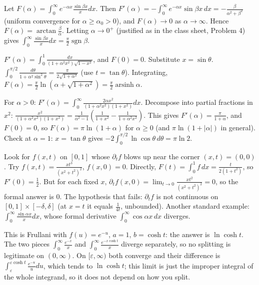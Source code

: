 \documentclass[11pt,a4paper]{article}
\begin{document}

Let \(F(\alpha)=\int_0^\infty e^{-\alpha x}\frac{\sin\beta x}xdx\). Then \(F'(\alpha)=-\int_0^\infty e^{-\alpha x}\sin\beta x\,dx=-\frac{\beta}{\alpha^2+\beta^2}\) (uniform convergence for \(\alpha\ge\alpha_0\gt0\)), and \(F(\alpha)\to0\) as \(\alpha\to\infty\).
Hence \(F(\alpha)=\arctan\frac\beta\alpha\). Letting \(\alpha\to0^+\) (justified as in the class sheet, Problem 4) gives \(\int_0^\infty\frac{\sin\beta x}xdx=\frac\pi2\operatorname{sgn}\beta\).

\(F'(\alpha)=\int_0^1\frac{dx}{(1+\alpha^2x^2)\sqrt{1-x^2}}\), and \(F(0)=0\). Substitute \(x=\sin\theta\).
\(\int_0^{\pi/2}\frac{d\theta}{1+\alpha^2\sin^2\theta}=\frac{\pi}{2\sqrt{1+\alpha^2}}\) (use \(t=\tan\theta\)). Integrating, \(F(\alpha)=\frac\pi2\ln\left(\alpha+\sqrt{1+\alpha^2}\right)=\frac\pi2\operatorname{arsinh}\alpha\).

For \(\alpha\gt0\): \(F'(\alpha)=\int_0^\infty\frac{2\alpha x^2}{(1+\alpha^2x^2)(1+x^2)}dx\). Decompose into partial fractions in \(x^2\): \(\frac{x^2}{(1+\alpha^2x^2)(1+x^2)}=\frac1{\alpha^2-1}\left(\frac1{1+x^2}-\frac1{1+\alpha^2x^2}\right)\).
This gives \(F'(\alpha)=\frac{\pi}{1+\alpha}\), and \(F(0)=0\), so \(F(\alpha)=\pi\ln(1+\alpha)\) for \(\alpha\ge0\) (and \(\pi\ln(1+\lvert\alpha\rvert)\) in general). Check at \(\alpha=1\): \(x=\tan\theta\) gives \(-2\int_0^{\pi/2}\ln\cos\theta\,d\theta=\pi\ln2\).

Look for \(f(x,t)\) on \([0,1]\) whose \(\partial_tf\) blows up near the corner \((x,t)=(0,0)\). Try \(f(x,t)=\frac{xt^3}{(x^2+t^2)^2}\), \(f(x,0)=0\).
Directly, \(F(t)=\int_0^1f\,dx=\frac{t}{2(1+t^2)}\), so \(F'(0)=\frac12\). But for each fixed \(x\), \(\partial_tf(x,0)=\lim_{t\to0}\frac{xt^2}{(x^2+t^2)^2}=0\), so the formal answer is \(0\). The hypothesis that fails: \(\partial_tf\) is not continuous on \([0,1]\times[-\delta,\delta]\) (at \(x=t\) it equals \(\frac1{4t}\), unbounded). Another standard example: \(\int_0^\infty\frac{\sin\alpha x}xdx\), whose formal derivative \(\int_0^\infty\cos\alpha x\,dx\) diverges.

This is Frullani with \(f(u)=e^{-u}\), \(a=1\), \(b=\cosh t\): the answer is \(\ln\cosh t\).
The two pieces \(\int_0^\infty\frac{e^{-x}}x\) and \(\int_0^\infty\frac{e^{-x\cosh t}}x\) diverge separately, so no splitting is legitimate on \((0,\infty)\). On \([\varepsilon,\infty)\) both converge and their difference is \(\int_\varepsilon^{\varepsilon\cosh t}\frac{e^{-u}}udu\), which tends to \(\ln\cosh t\); this limit is just the improper integral of the whole integrand, so it does not depend on how you split.
\end{document}
